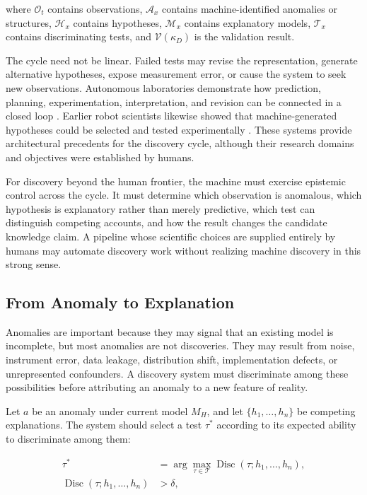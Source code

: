 where $\mathcal{O}_{t}$ contains observations, $\mathcal{A}_{x}$ contains
machine-identified anomalies or structures, $\mathcal{H}_{x}$ contains
hypotheses, $\mathcal{M}_{x}$ contains explanatory models,
$\mathcal{T}_{x}$ contains discriminating tests, and
$\mathcal{V}(\kappa_D)$ is the validation result.

The cycle need not be linear. Failed tests may revise the representation,
generate alternative hypotheses, expose measurement error, or cause the system
to seek new observations. Autonomous laboratories demonstrate how prediction,
planning, experimentation, interpretation, and revision can be connected in a
closed loop \cite{boiko2023autonomous,szymanski2023autonomous}. Earlier robot
scientists likewise showed that machine-generated hypotheses could be selected
and tested experimentally \cite{king2004robot,king2009automation}. These systems
provide architectural precedents for the discovery cycle, although their
research domains and objectives were established by humans.

For discovery beyond the human frontier, the machine must exercise epistemic
control across the cycle. It must determine which observation is anomalous,
which hypothesis is explanatory rather than merely predictive, which test can
distinguish competing accounts, and how the result changes the candidate
knowledge claim. A pipeline whose scientific choices are supplied entirely by
humans may automate discovery work without realizing machine discovery in this
strong sense.

\subsection{\textbf{From Anomaly to Explanation}}

Anomalies are important because they may signal that an existing model is
incomplete, but most anomalies are not discoveries. They may result from noise,
instrument error, data leakage, distribution shift, implementation defects, or
unrepresented confounders. A discovery system must discriminate among these
possibilities before attributing an anomaly to a new feature of reality.

Let $a$ be an anomaly under current model $M_H$, and let
$\{h_1,\ldots,h_n\}$ be competing explanations. The system should select a test
$\tau^{*}$ according to its expected ability to discriminate among them:

\begin{equation}
\begin{aligned}
\tau^{*}
&=\arg\max_{\tau\in\mathcal{T}}
\operatorname{Disc}
(\tau;h_1,\ldots,h_n),\\
\operatorname{Disc}
(\tau;h_1,\ldots,h_n)
&>\delta,
\end{aligned}
\label{eq:discriminating_test}
\end{equation}

